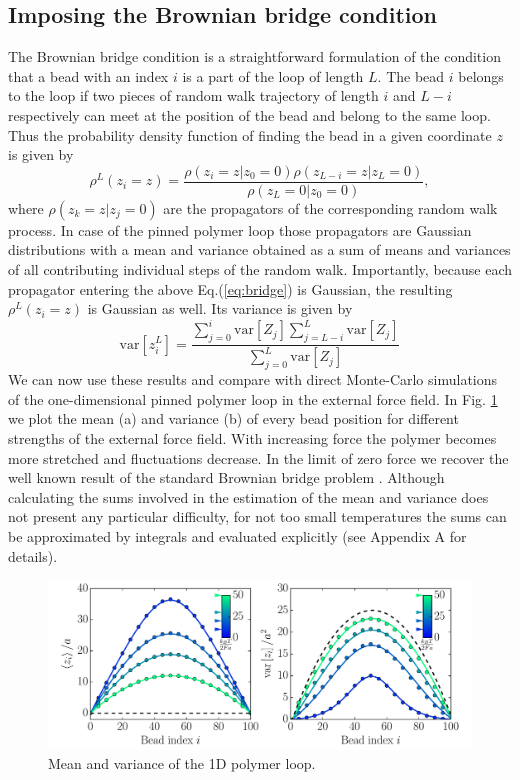 \documentclass[aps,showpacs,twocolumn,floatfix,prx,superscriptaddress]{revtex4-1}
\begin{document}
\subsection{Imposing the Brownian bridge condition}
The Brownian bridge condition is a straightforward formulation of the condition that a bead with an index $i$ is a part of the loop of length $L$. The bead $i$ belongs to the loop if two pieces of random walk trajectory of length $i$ and $L-i$ respectively can meet at the position of the bead and belong to the same loop. Thus the probability density function of finding the bead in a given coordinate $z$ is given by
\begin{equation}
    \label{eq:bridge}
    \rho^L\left(z_i = z\right) = \frac{\rho\left(z_i = z \vert z_0 = 0\right)
        \rho\left(z_{L-i} = z \vert z_L = 0\right)}{\rho\left(z_L = 0 \vert z_0
            = 0\right)},
\end{equation}
where $ \rho\left(z_k = z \vert z_j = 0\right)$ are the propagators of the corresponding random walk process. In case of the pinned polymer loop those propagators are Gaussian distributions with a mean and variance obtained as a sum of means and variances of all contributing individual steps of the random walk. Importantly, because each propagator entering the above Eq.(\ref{eq:bridge}) is Gaussian, the resulting $\rho^L\left(z_i = z\right)$ is Gaussian as well. Its variance is given by
\begin{equation}
    \label{eq:bridgeVar}
    \text{var}\left[z_i^L\right] =
    \frac{\sum_{j=0}^i\text{var}\left[Z_j\right]\sum_{j=L-i}^L\text{var}\left[Z_j\right]}{\sum_{j=0}^L\text{var}\left[Z_j\right]}
\end{equation}
We can now use these results and compare with direct Monte-Carlo simulations of
the one-dimensional pinned polymer loop in the external force field. In Fig.
\ref{fig:meanVar} we plot the mean (a) and variance (b) of every bead position for different strengths of the external force field. With increasing force the polymer becomes more stretched and fluctuations decrease. In the limit of zero force we recover the well known result of the standard Brownian bridge problem \cite{}. Although calculating the sums involved in the estimation of the mean and variance does not present any particular difficulty, for not too small temperatures the sums can be approximated by integrals and evaluated explicitly (see Appendix A for details). 
\begin{figure}[htpb]
    \centering
    \includegraphics[width=1.0\linewidth]{meanVar}
    \caption{Mean and variance of the 1D polymer loop.}
    \label{fig:meanVar}
\end{figure}
\end{document}
